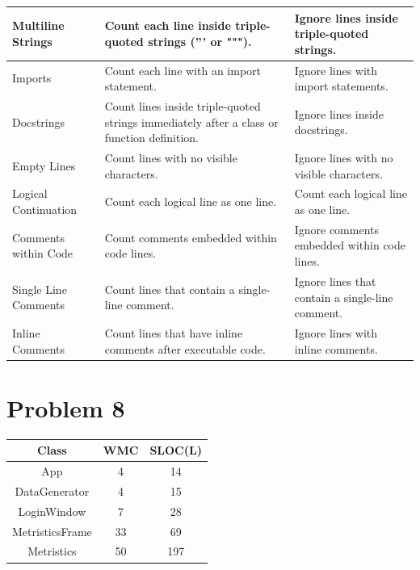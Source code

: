 {{\begin{table}[H]
\begin{tabular}{|p{3cm}|p{7cm}|p{5cm}|}
         Multiline Strings  & Count each line inside triple-quoted strings (''' or """). & Ignore lines inside triple-quoted strings.  \\ \hline 
         Imports & Count each line with an import statement. & Ignore lines with import statements.  \\ \hline 
         Docstrings  & Count lines inside triple-quoted strings immediately after a class or function definition. & Ignore lines inside docstrings.  \\ \hline
         Empty Lines  & Count lines with no visible characters.  & Ignore lines with no visible characters. \\ \hline
         Logical Continuation  & Count each logical line as one line.  & Count each logical line as one line. \\ \hline
         Comments within Code  & Count comments embedded within code lines. & Ignore comments embedded within code lines. \\ \hline
         Single Line Comments & Count lines that contain a single-line comment. & Ignore lines that contain a single-line comment. \\ \hline
         Inline Comments & Count lines that have inline comments after executable code. & Ignore lines with inline comments. \\ \hline
    \end{tabular}
    \label{tab:my_label}
\end{table}
\pagebreak

\section{Problem 8}

    
\begin{table}[H]
    \RaggedRight
    \begin{tabular}{|c|c|c|} \hline
        Class & WMC & SLOC(L)  \\ \hline
        App & 4 & 14 \\ \hline
        DataGenerator & 4 & 15 \\ \hline
        LoginWindow & 7 & 28 \\ \hline
        MetristicsFrame & 33 & 69 \\ \hline
        Metristics & 50 & 197 \\ \hline
    \end{tabular}
    \label{tab:my_label}
\end{table}

}}
